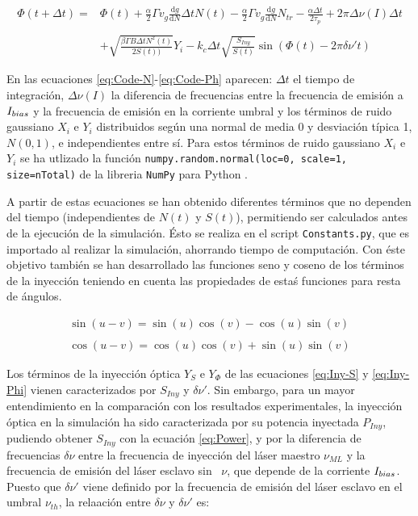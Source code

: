 			\begin{equation}
				\begin{matrix}
					\Phi(t + \Delta t) =  & \Phi(t) + \frac{\alpha}{2}\Gamma v_g \frac{\mathrm{d}g}{\mathrm{d}N} \Delta t N(t) - \frac{\alpha}{2}\Gamma v_g \frac{\mathrm{d} g}{\mathrm{d}N} N_{tr} - \frac{\alpha\Delta t}{2\tau_p} + 2\pi\Delta\nu(I)\Delta t \\ \\
					& + \sqrt{\frac{\beta \Gamma B \Delta t N^2(t)}{2 S(t))}} Y_i - k_c\Delta t\sqrt{\frac{S_{Iny}}{S(t)}} \sin(\Phi(t) - 2\pi \delta\nu't)
				\end{matrix}
				\label{eq:Code-Ph}
			\end{equation}

		En las ecuaciones \ref{eq:Code-N}-\ref{eq:Code-Ph} aparecen: $\Delta t$ el tiempo de integraci\'on, $\Delta\nu(I)$ la diferencia de frecuencias entre la frecuencia de emisi\'on a $I_{bias}$ y la frecuencia de emisi\'on en la corriente umbral \cite{Chaves19} y los t\'erminos de ruido gaussiano $X_i$ e $Y_i$ distribuidos según una normal de media 0 y desviación típica 1, $N(0, 1)$, e independientes entre s\'i. Para estos t\'erminos de ruido gaussiano $X_i$ e $Y_i$ se ha utlizado la funci\'on \texttt{numpy.random.normal(loc=0, scale=1, size=nTotal)} de la libreria \texttt{NumPy} para Python \cite{numpy}. 

		A partir de estas ecuaciones se han obtenido diferentes t\'erminos que no dependen del tiempo (independientes de $N(t)$ y $S(t)$), permitiendo ser calculados antes de la ejecuci\'on de la simulaci\'on. \'Esto se realiza en el script \texttt{Constants.py}, que es importado al realizar la simulaci\'on, ahorrando tiempo de computaci\'on. Con \'este objetivo tambi\'en se han desarrollado las funciones seno y coseno de los t\'erminos de la inyecci\'on teniendo en cuenta las propiedades de esta\'s funciones para resta de \'angulos.

			\begin{equation}
				\begin{matrix}
					\sin(u - v) = \sin(u)\cos(v) - \cos(u)\sin(v) \\ \\

					\cos(u - v) = \cos(u)\cos(v) + \sin(u)\sin(v) 
				\end{matrix}
			\end{equation}

		Los t\'erminos de la inyecci\'on \'optica $Y_S$ e $Y_{\Phi}$ de las ecuaciones \ref{eq:Iny-S} y \ref{eq:Iny-Phi} vienen caracterizados por $S_{Iny}$ y $\delta\nu'$. Sin embargo, para un mayor entendimiento en la comparaci\'on con los resultados experimentales, la inyecci\'on \'optica en la simulaci\'on ha sido caracterizada por su potencia inyectada $P_{Iny}$, pudiendo obtener $S_{Iny}$ con la ecuaci\'on \ref{eq:Power}, y por la diferencia de frecuencias $\delta\nu$ entre la frecuencia de inyecci\'on del l\'aser maestro $\nu_{ML}$ y la frecuencia de emisi\'on del l\'aser esclavo sin \gs\ $\nu$, que depende de la corriente $I_{bias}$. Puesto que $\delta\nu'$ viene definido por la frecuencia de emisi\'on del l\'aser esclavo en el umbral $\nu_{th}$, la relaación entre $\delta\nu$ y $\delta\nu'$ es:

